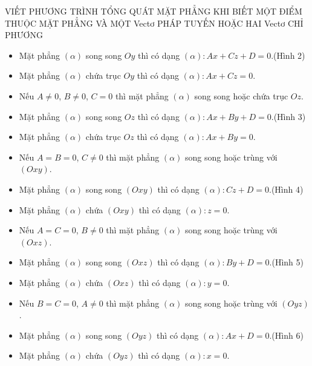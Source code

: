 \begin{dang}{VIẾT PHƯƠNG TRÌNH TỔNG QUÁT MẶT PHẲNG KHI BIẾT MỘT ĐIỂM THUỘC MẶT PHẲNG VÀ MỘT Vectơ PHÁP TUYẾN HOẶC HAI Vectơ CHỈ PHƯƠNG}
\begin{enumerate}[a.]
\begin{itemize}
\item[+] Mặt phẳng $\left(\alpha\right)$ song song $Oy$ thì có dạng $\left(\alpha\right) \colon Ax+Cz+D=0$.(Hình 2)
\item[+] Mặt phẳng $\left(\alpha\right)$ chứa trục $Oy$ thì có dạng $\left(\alpha\right) \colon Ax+Cz=0$.
\item Nếu $A\neq 0$, $B \neq 0$, $C = 0$ thì mặt phẳng $\left(\alpha\right)$ song song hoặc chứa trục $Oz$.
\item[+] Mặt phẳng $\left(\alpha\right)$ song song $Oz$ thì có dạng $\left(\alpha\right) \colon Ax+By+D=0$.(Hình 3)
\item[+] Mặt phẳng $\left(\alpha\right)$ chứa trục $Oz$ thì có dạng $\left(\alpha\right) \colon Ax+By=0$.
\item Nếu $A=B= 0$, $C \neq 0$ thì mặt phẳng $\left(\alpha\right)$ song song hoặc trùng với $\left(Oxy\right)$.
\item[+] Mặt phẳng $\left(\alpha\right)$ song song $\left(Oxy\right)$ thì có dạng $\left(\alpha\right) \colon Cz+D=0$.(Hình 4)
\item[+] Mặt phẳng $\left(\alpha\right)$ chứa $\left(Oxy\right)$ thì có dạng $\left(\alpha\right) \colon z=0$.
\item Nếu $A=C= 0$, $B \neq 0$ thì mặt phẳng $\left(\alpha\right)$ song song hoặc trùng với $\left(Oxz\right)$.
\item[+] Mặt phẳng $\left(\alpha\right)$ song song $\left(Oxz\right)$ thì có dạng $\left(\alpha\right) \colon By+D=0$.(Hình 5)
\item[+] Mặt phẳng $\left(\alpha\right)$ chứa $\left(Oxz\right)$ thì có dạng $\left(\alpha\right) \colon y=0$.
\item Nếu $B=C= 0$, $A \neq 0$ thì mặt phẳng $\left(\alpha\right)$ song song hoặc trùng với $\left(Oyz\right)$.
\item[+] Mặt phẳng $\left(\alpha\right)$ song song $\left(Oyz\right)$ thì có dạng $\left(\alpha\right) \colon Ax+D=0$.(Hình 6)
\item[+] Mặt phẳng $\left(\alpha\right)$ chứa $\left(Oyz\right)$ thì có dạng $\left(\alpha\right) \colon x=0$.
\end{itemize}


\end{enumerate}
\end{dang}
